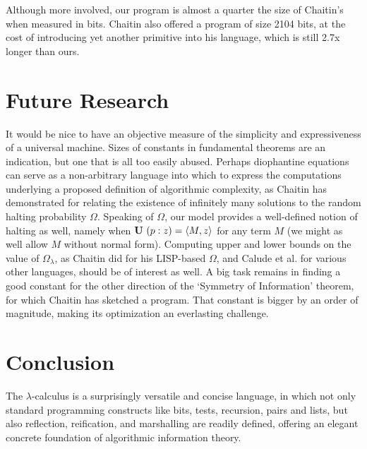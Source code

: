 \documentclass{article}
\newcommand{\tup}[1]{\langle #1 \rangle}
\newcommand{\pref}[2]{(#1:#2)}
\newcommand{\CU}{{\bf U}}
\begin{document}
Although more involved, our program is almost a quarter the size of Chaitin's
when measured in bits. Chaitin also offered a program of size 2104 bits,
at the cost of introducing yet another primitive into his language,
which is still 2.7x longer than ours.


\section{Future Research}
It would be nice to have an objective measure of the simplicity and expressiveness
of a universal machine. Sizes of constants in fundamental theorems are an indication,
but one that is all too easily abused. Perhaps diophantine equations can serve as
a non-arbitrary language into which to express the computations underlying a proposed
definition of algorithmic complexity, as Chaitin has demonstrated for relating the existence
of infinitely many solutions to the random halting probability $\Omega$.
Speaking of $\Omega$, our model provides a well-defined notion of halting as well,
namely when $\CU\ \pref{p}{z} = \tup{M,z}$ for any term $M$ (we might as well allow $M$ without
normal form). Computing upper and lower bounds on the value of $\Omega_{\lambda}$,
as Chaitin did for his LISP-based $\Omega$, and Calude et al. for various other languages,
should be of interest as well.
A big task remains in finding a good constant for the other direction of
the `Symmetry of Information' theorem, for which Chaitin has sketched a program.
That constant is bigger by an order of magnitude, making its optimization
an everlasting challenge.

\section{Conclusion}
The $\lambda$-calculus is a surprisingly versatile and concise language,
in which not only standard programming constructs like bits, tests, recursion,
pairs and lists, but also reflection, reification, and marshalling are
readily defined, offering an elegant concrete foundation
of algorithmic information theory.
\end{document}
